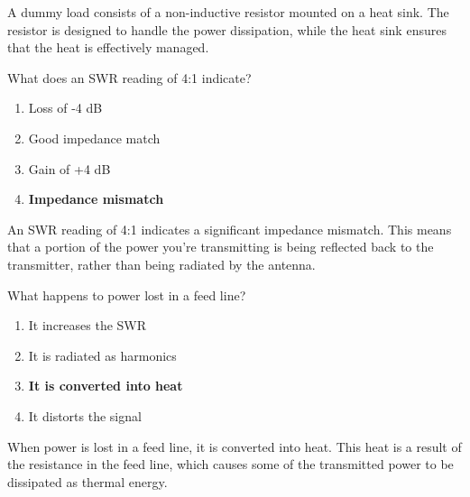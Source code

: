 A dummy load consists of a non-inductive resistor mounted on a heat sink. The resistor is designed to handle the power dissipation, while the heat sink ensures that the heat is effectively managed.

\begin{tcolorbox}[colback=gray!10!white,colframe=black!75!black,title={T7C06}]
    What does an SWR reading of 4:1 indicate?
    \begin{enumerate}[label=\Alph*),noitemsep]
        \item Loss of -4 dB
        \item Good impedance match
        \item Gain of +4 dB
        \item \textbf{Impedance mismatch}
    \end{enumerate}
\end{tcolorbox}

An SWR reading of 4:1 indicates a significant impedance mismatch. This means that a portion of the power you're transmitting is being reflected back to the transmitter, rather than being radiated by the antenna.

\begin{tcolorbox}[colback=gray!10!white,colframe=black!75!black,title={T7C07}]
    What happens to power lost in a feed line?
    \begin{enumerate}[label=\Alph*),noitemsep]
        \item It increases the SWR
        \item It is radiated as harmonics
        \item \textbf{It is converted into heat}
        \item It distorts the signal
    \end{enumerate}
\end{tcolorbox}

When power is lost in a feed line, it is converted into heat. This heat is a result of the resistance in the feed line, which causes some of the transmitted power to be dissipated as thermal energy.
